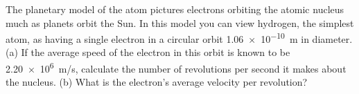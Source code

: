 \documentclass[main-ap-physics.tex]{subfiles}
\begin{document}
\begin{exercise}
    The planetary model of the atom pictures electrons orbiting the atomic nucleus much as planets orbit the Sun. In this model you can view hydrogen, the simplest atom, as having a single electron in a circular orbit \SI{1.06e-10}{m} in diameter. (a) If the average speed of the electron in this orbit is known to be \SI{2.20e6}{m/s}, calculate the number of revolutions per second it makes about the nucleus. (b) What is the electron's average velocity per revolution?
\end{exercise}








\end{document}
